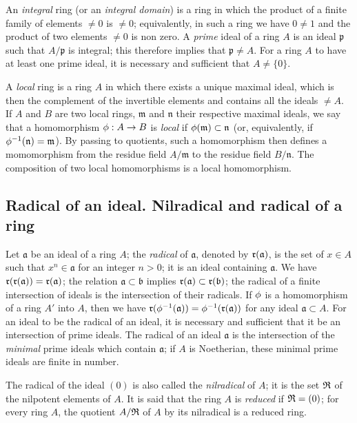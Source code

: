 \begin{env}[1.0.6]
\label{env-0.1.0.6}
An {\em integral} ring (or an {\em integral domain}) is a ring in which the
product of a finite family of elements $\neq 0$ is $\neq 0$; equivalently, in
such a ring we have $0\neq 1$ and the product of two elements $\neq 0$ is non
zero. A {\em prime} ideal of a ring $A$ is an ideal $\mathfrak{p}$ such that
$A/\mathfrak{p}$ is integral; this therefore implies that $\mathfrak{p}\neq A$.
For a ring $A$ to have at least one prime ideal, it is necessary and sufficient
that $A\neq\{0\}$.
\end{env}

\begin{env}[1.0.7]
\label{env-0.1.0.7}
A {\em local} ring is a ring $A$ in which there exists a unique maximal ideal,
which is then the complement of the invertible elements and contains all the
ideals $\neq A$. If $A$ and $B$ are two local rings, $\mathfrak{m}$ and
$\mathfrak{n}$ their respective maximal ideals, we say that a homomorphism
$\phi:A\to B$ is {\em local} if $\phi(\mathfrak{m})\subset\mathfrak{n}$ (or,
equivalently, if $\phi^{-1}(\mathfrak{n})=\mathfrak{m}$). By passing to
quotients, such a homomorphism then defines a momomorphism from the residue
field $A/\mathfrak{m}$ to the residue field $B/\mathfrak{n}$. The composition of
two local homomorphisms is a local homomorphism.
\end{env}

\subsection{Radical of an ideal. Nilradical and radical of a ring}
\label{subsection-radical-and-nilradical}

\begin{env}[1.1.1]
\label{env-0.1.1.1}
Let $\mathfrak{a}$ be an ideal of a ring $A$; the {\em radical} of
$\mathfrak{a}$, denoted by $\mathfrak{r}(\mathfrak{a})$, is the set of $x\in A$ such
that $x^n\in\mathfrak{a}$ for an integer $n>0$; it is an ideal containing
$\mathfrak{a}$. We have $\mathfrak{r}(\mathfrak{r}(\mathfrak{a}))=\mathfrak{r}(\mathfrak{a})$;
the relation $\mathfrak{a}\subset\mathfrak{b}$ implies
$\mathfrak{r}(\mathfrak{a})\subset\mathfrak{r}(\mathfrak{b})$; the radical of a finite
intersection of ideals is the intersection of their radicals. If $\phi$ is a
homomorphism of a ring $A'$ into $A$, then we have
$\mathfrak{r}(\phi^{-1}(\mathfrak{a}))=\phi^{-1}(\mathfrak{r}(\mathfrak{a}))$ for any ideal
$\mathfrak{a}\subset A$. For an ideal to be the radical of an ideal, it is
necessary and sufficient that it be an intersection of prime ideals. The radical
of an ideal $\mathfrak{a}$ is the intersection of the {\em minimal} prime
ideals which contain $\mathfrak{a}$; if $A$ is Noetherian, these minimal prime
ideals are finite in number.

The radical of the ideal $(0)$ is also called the {\em nilradical} of $A$; it
is the set $\mathfrak{R}$ of the nilpotent elements of $A$. It is said that the ring
$A$ is {\em reduced} if $\mathfrak{R}=(0)$; for every ring $A$, the quotient
$A/\mathfrak{R}$ of $A$ by its nilradical is a reduced ring.
\end{env}

